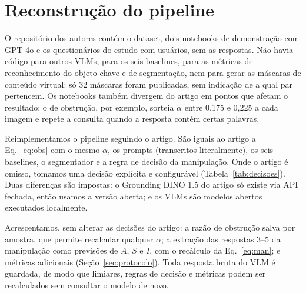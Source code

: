 \documentclass[journal,onecolumn]{IEEEtran}
\begin{document}
\section{Reconstrução do pipeline}
\label{sec:impl}

O repositório dos autores contém o dataset, dois notebooks de demonstração com GPT-4o e os
questionários do estudo com usuários, sem as respostas. Não havia código para outros VLMs, para os
seis baselines, para as métricas de reconhecimento do objeto-chave e de segmentação, nem para gerar as
máscaras de conteúdo virtual: só 32 máscaras foram publicadas, sem indicação de a qual par pertencem.
Os notebooks também divergem do artigo em pontos que afetam o resultado; o de obstrução, por exemplo,
sorteia $\alpha$ entre 0,175 e 0,225 a cada imagem e repete a consulta quando a resposta contém certas
palavras.

Reimplementamos o pipeline seguindo o artigo. São iguais ao artigo a Eq.~\eqref{eq:obs} com o mesmo
$\alpha$, os prompts (transcritos literalmente), os seis baselines, o segmentador e a regra de decisão
da manipulação. Onde o artigo é omisso, tomamos uma decisão explícita e configurável
(Tabela~\ref{tab:decisoes}). Duas diferenças são impostas: o Grounding DINO 1.5 do artigo só existe
via API fechada, então usamos a versão aberta; e os VLMs são modelos abertos executados localmente.

Acrescentamos, sem alterar as decisões do artigo: a razão de obstrução salva por amostra, que permite
recalcular qualquer $\alpha$; a extração das respostas 3--5 da manipulação como previsões de $A$, $S$ e
$I$, com o recálculo da Eq.~\eqref{eq:man}; e métricas adicionais (Seção~\ref{sec:protocolo}). Toda
resposta bruta do VLM é guardada, de modo que limiares, regras de decisão e métricas podem ser
recalculados sem consultar o modelo de novo.
\end{document}
